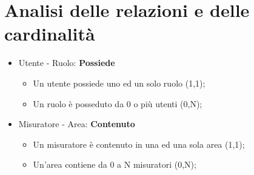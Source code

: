 \section{Analisi delle relazioni e delle cardinalità}

\begin{itemize}
    
    \item Utente - Ruolo: \textbf{Possiede}
    \begin{itemize}
        \item Un utente possiede uno ed un solo ruolo (1,1);
        \item Un ruolo è posseduto da 0 o più utenti (0,N);
    \end{itemize}

    \item Misuratore - Area: \textbf{Contenuto}
    \begin{itemize}
        \item Un misuratore è contenuto in una ed una sola area (1,1);
        \item Un'area contiene da 0 a N misuratori (0,N);
    \end{itemize}
    
\end{itemize}